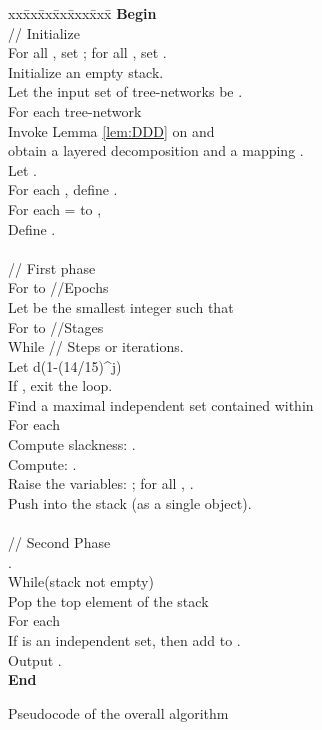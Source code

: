 \documentclass[11pt]{article}
\begin{document}
\begin{figure}[t!]
\begin{center}
\begin{boxedminipage}{\hsize}
\begin{tabbing}
xx\=xx\=xx\=xx\=xxx\=xxx\=\kill
\textbf{Begin}  \\
\> // Initialize \\
\> For all , set ; for all , set .\\
\> Initialize an empty stack.\\
\> Let the input set of tree-networks be .\\
\> For each tree-network \\
\> \> Invoke Lemma \ref{lem:DDD} on  and \\
\> \> \> obtain a layered decomposition  and a mapping .\\
\> \> Let . \\
\> \> For each , define .\\
\> For each  =  to , \\
\> \> Define .\\
\>\\
\> // First phase\\
\> For  to  \quad\quad//Epochs\\
\> \> Let  be the smallest integer such that  \\
\> \> For  to  \quad \quad //Stages \\
\> \> \> While \quad \quad // Steps or iterations.\\
\> \> \> \> Let d(1-(14/15)^j)\\
\> \> \> \> If , exit the loop.\\
\> \> \> \> Find a maximal independent set  contained within \\
\> \> \> \> For each \\
\> \> \> \> \> Compute slackness: .\\
\> \> \> \> \> Compute: .\\
\> \> \> \> \> Raise the variables: ; 
		for all , .\\
\> \> \> \> Push  into the stack (as a single object).\\
\>\\
\> // Second Phase\\
\> \> .\\
\> \> While(stack not empty)\\
\> \> \> Pop the top element  of the stack\\
\> \> \> For each \\
\> \> \> \> If  is an independent set, then add  to .\\
\> Output .\\
\textbf{End}
\end{tabbing}
\end{boxedminipage}
\end{center}
\caption{Pseudocode of the overall algorithm}
\label{fig:full-pseudo}
\end{figure}
\end{document}
